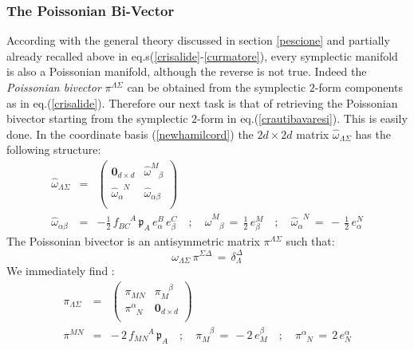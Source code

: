 \documentclass[10pt,a4paper]{article}
\newcommand{\ft}[2]{{\textstyle\frac{#1}{#2}}}
\begin{document}
\subsubsection{The Poissonian Bi-Vector}
According with the general theory discussed in section \ref{pescione} and partially already recalled above in eq.s(\ref{crisalide}-\ref{curmatore}), every symplectic manifold
is also a Poissonian manifold, although the reverse is not true. Indeed the \textit{Poissonian bivector} $\pi^{\Lambda\Sigma}$ can be obtained from the symplectic $2$-form components as in
eq.(\ref{crisalide}). Therefore our next task is that of retrieving the Poissonian bivector starting from the symplectic $2$-form in eq.(\ref{crautibavaresi}). This is easily done. In the coordinate basis (\ref{newhamilcord}) the $2d\times 2d$ matrix $\hat{\omega}_{\Lambda\Sigma}$ has the following structure:
\begin{eqnarray}\label{castigliano}
  \hat{\omega}_{\Lambda\Sigma} & = &
  \left(
  \begin{array}{c|c}
  \mathbf{0}_{d\times d} & \hat{\omega}^M_{\phantom{M}\beta} \\
  \hline
  \hat{\omega}_{\alpha}^{\phantom{\alpha}N} & \hat{\omega}_{\alpha\beta} \\
  \end{array}
  \right) \nonumber\\
 \hat{\omega}_{\alpha\beta} & = & - \ft 12 \, f^{\phantom{BC}A}_{BC} \,\mathfrak{p}_A\,e^B_\alpha \, e^C_\beta \quad ; \quad
  \hat{\omega}^M_{\phantom{M}\beta}\, = \, \ft 12 \, e^M_\beta \quad ; \quad
  \hat{\omega}_{\alpha}^{\phantom{\alpha}N} \, = \, - \, \ft 12 \, e^N_\alpha
\end{eqnarray}
The Poissonian bivector is an antisymmetric matrix $\pi^{\Lambda\Sigma}$ such that:
\begin{equation}\label{farlocco}
  \omega_{\Lambda\Sigma} \,\pi^{\Sigma\Delta} \, = \, \delta^\Delta_\Lambda
\end{equation}
We immediately find :
\begin{eqnarray}\label{manchego}
  \pi_{\Lambda\Sigma} & = &
  \left(
  \begin{array}{c|c}
  \pi_{MN} & \pi_M^{\phantom{M}\beta} \\
  \hline
  \pi^{\alpha}_{\phantom{\alpha}N} & \mathbf{0}_{d\times d} \\
  \end{array}
  \right) \nonumber\\
 \pi^{MN} & = &  -\, 2  \, f^{\phantom{MN}A}_{MN} \, \mathfrak{p}_A \quad ; \quad
  \pi_M^{\phantom{M}\beta}\, = \, - 2 \, e_M^\beta \quad ; \quad
  \pi^{\alpha}_{\phantom{\alpha}N} \, = \, 2 \, e_N^\alpha
\end{eqnarray}
\end{document}
